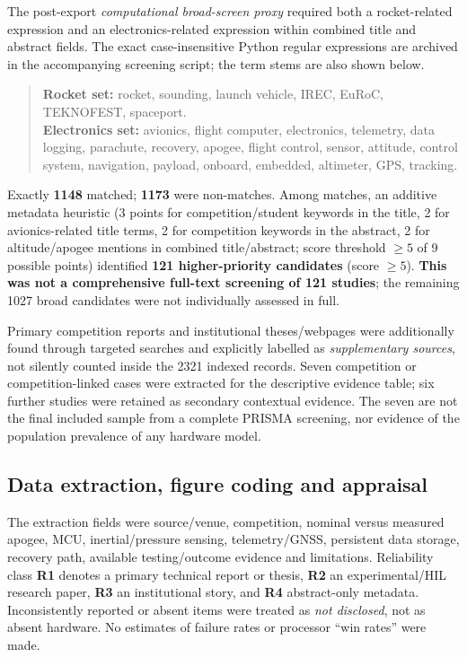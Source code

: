 \documentclass[10pt,a4paper]{article}
\begin{document}
The post-export \emph{computational broad-screen proxy} required both a rocket-related expression and an electronics-related expression within combined title and abstract fields. The exact case-insensitive Python regular expressions are archived in the accompanying screening script; the term stems are also shown below.
\begin{quote}\footnotesize
\textbf{Rocket set:} rocket, sounding, launch vehicle, IREC, EuRoC, TEKNOFEST, spaceport.\\
\textbf{Electronics set:} avionics, flight computer, electronics, telemetry, data logging, parachute, recovery, apogee, flight control, sensor, attitude, control system, navigation, payload, onboard, embedded, altimeter, GPS, tracking.
\end{quote} Exactly \textbf{1148} matched; \textbf{1173} were non-matches. Among matches, an additive metadata heuristic (3 points for competition/student keywords in the title, 2 for avionics-related title terms, 2 for competition keywords in the abstract, 2 for altitude/apogee mentions in combined title/abstract; score threshold $\ge5$ of 9 possible points) identified \textbf{121 higher-priority candidates} (score $\geq5$). \textbf{This was not a comprehensive full-text screening of 121 studies}; the remaining 1027 broad candidates were not individually assessed in full.

Primary competition reports and institutional theses/webpages were additionally found through targeted searches and explicitly labelled as \emph{supplementary sources}, not silently counted inside the 2321 indexed records. Seven competition or competition-linked cases were extracted for the descriptive evidence table; six further studies were retained as secondary contextual evidence. The seven are not the final included sample from a complete PRISMA screening, nor evidence of the population prevalence of any hardware model.

\subsection{Data extraction, figure coding and appraisal}
The extraction fields were source/venue, competition, nominal versus measured apogee, MCU, inertial/pressure sensing, telemetry/GNSS, persistent data storage, recovery path, available testing/outcome evidence and limitations. Reliability class \textbf{R1} denotes a primary technical report or thesis, \textbf{R2} an experimental/HIL research paper, \textbf{R3} an institutional story, and \textbf{R4} abstract-only metadata. Inconsistently reported or absent items were treated as \emph{not disclosed}, not as absent hardware. No estimates of failure rates or processor ``win rates'' were made.
\end{document}
